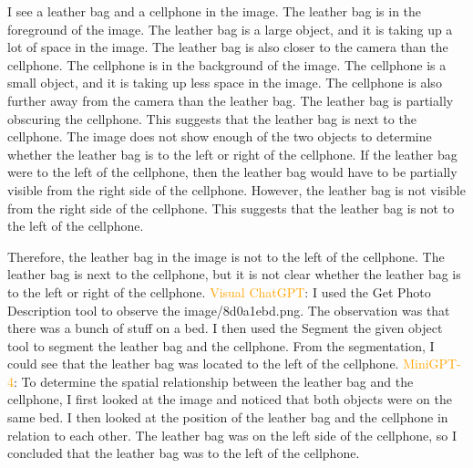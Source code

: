 \begin{enumerate}
    I see a leather bag and a cellphone in the image.
    The leather bag is in the foreground of the image. The leather bag is a large object, and it is taking up a lot of space in the image. The leather bag is also closer to the camera than the cellphone.
    The cellphone is in the background of the image. The cellphone is a small object, and it is taking up less space in the image. The cellphone is also further away from the camera than the leather bag.
    The leather bag is partially obscuring the cellphone. This suggests that the leather bag is next to the cellphone.
    The image does not show enough of the two objects to determine whether the leather bag is to the left or right of the cellphone.
    If the leather bag were to the left of the cellphone, then the leather bag would have to be partially visible from the right side of the cellphone. However, the leather bag is not visible from the right side of the cellphone. This suggests that the leather bag is not to the left of the cellphone.
    
    Therefore, the leather bag in the image is not to the left of the cellphone. The leather bag is next to the cellphone, but it is not clear whether the leather bag is to the left or right of the cellphone.   
    \subitem \textcolor{orange}{Visual ChatGPT}: I used the Get Photo Description tool to observe the image/8d0a1ebd.png. The observation was that there was a bunch of stuff on a bed. I then used the Segment the given object tool to segment the leather bag and the cellphone. From the segmentation, I could see that the leather bag was located to the left of the cellphone.
    \subitem \textcolor{orange}{MiniGPT-4}: To determine the spatial relationship between the leather bag and the cellphone, I first looked at the image and noticed that both objects were on the same bed. I then looked at the position of the leather bag and the cellphone in relation to each other. The leather bag was on the left side of the cellphone, so I concluded that the leather bag was to the left of the cellphone. 
\end{enumerate}

